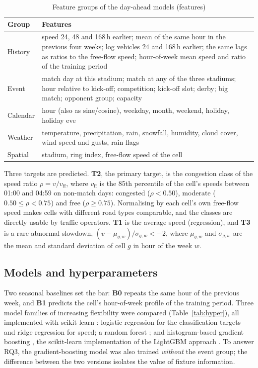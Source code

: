 \documentclass[conference]{IEEEtran}
\begin{document}
\begin{table}[t]
\caption{Feature groups of the day-ahead models (\vNFeatures features)}
\label{tab:features}
\centering\footnotesize
\begin{tabular}{@{}p{1.35cm}p{6.6cm}@{}}
\toprule
Group & Features \\
\midrule
History & speed 24, 48 and 168\,h earlier; mean of the same hour in the previous four weeks; log vehicles 24 and 168\,h earlier; the same lags as ratios to the free-flow speed; hour-of-week mean speed and ratio of the training period \\
Event & match day at this stadium; match at any of the three stadiums; hour relative to kick-off; competition; kick-off slot; derby; big match; opponent group; capacity \\
Calendar & hour (also as sine/cosine), weekday, month, weekend, holiday, holiday eve \\
Weather & temperature, precipitation, rain, snowfall, humidity, cloud cover, wind speed and gusts, rain flags \\
Spatial & stadium, ring index, free-flow speed of the cell \\
\bottomrule
\end{tabular}
\end{table}

Three targets are predicted. \textbf{T2}, the primary target, is the congestion class of the speed ratio $\rho=v/v_{\mathrm{ff}}$, where $v_{\mathrm{ff}}$ is the 85th percentile of the cell's speeds between 01:00 and 04:59 on non-match days: congested ($\rho<0.50$), moderate ($0.50\le\rho<0.75$) and free ($\rho\ge0.75$). Normalising by each cell's own free-flow speed makes cells with different road types comparable, and the classes are directly usable by traffic operators. \textbf{T1} is the average speed (regression), and \textbf{T3} is a rare abnormal slowdown, $(v-\mu_{g,w})/\sigma_{g,w}<-2$, where $\mu_{g,w}$ and $\sigma_{g,w}$ are the mean and standard deviation of cell $g$ in hour of the week $w$.

\subsection{Models and hyperparameters}
Two seasonal baselines set the bar: \textbf{B0} repeats the same hour of the previous week, and \textbf{B1} predicts the cell's hour-of-week profile of the training period. Three model families of increasing flexibility were compared (Table~\ref{tab:hyper}), all implemented with scikit-learn \cite{sklearn}: logistic regression for the classification targets and ridge regression for speed; a random forest \cite{breiman2001}; and histogram-based gradient boosting \cite{friedman2001}, the scikit-learn implementation of the LightGBM approach \cite{ke2017}. To answer RQ3, the gradient-boosting model was also trained \emph{without} the event group; the difference between the two versions isolates the value of fixture information.
\end{document}
